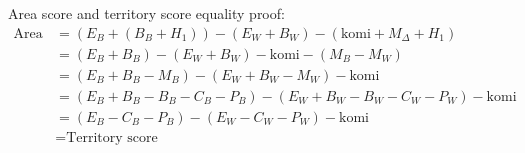 \documentclass[11pt]{article}
\begin{document}
Area score and territory score equality proof:
\begin{align}
\text{Area score} &= (E_B + (B_B+H_1)) - (E_W + B_W) - (\text{komi} + M_\Delta + H_1) \\
&= (E_B + B_B) - (E_W + B_W) - \text{komi} - (M_B - M_W)\\
&= (E_B + B_B - M_B) - (E_W + B_W - M_W) - \text{komi} \\
&= (E_B + B_B - B_B - C_B - P_B ) - (E_W + B_W - B_W - C_W - P_W) - \text{komi} \\
&= (E_B - C_B - P_B) - (E_W - C_W - P_W) - \text{komi} \\
&= \text{Territory score}
\end{align}
\end{document}
